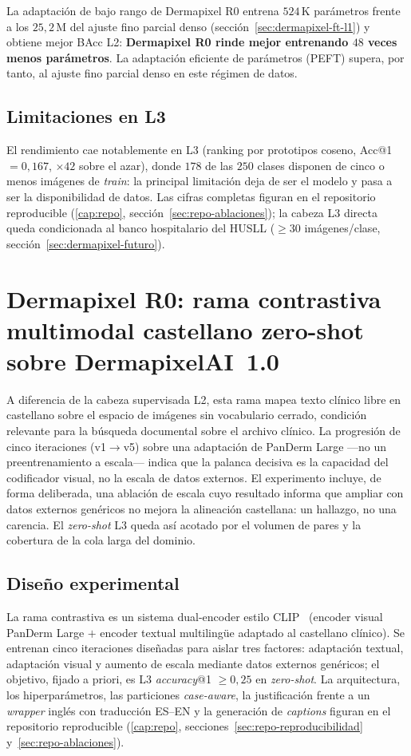 La adaptación de bajo rango de Dermapixel R0 entrena $524$\,K
parámetros frente a los $25{,}2$\,M del ajuste fino parcial denso
(sección~\ref{sec:dermapixel-ft-l1}) y obtiene mejor BAcc L2:
\textbf{Dermapixel R0 rinde mejor entrenando $48$ veces menos
parámetros}. La adaptación eficiente de parámetros (PEFT) supera, por
tanto, al ajuste fino parcial denso en este régimen de datos.

\subsection{Limitaciones en L3}

El rendimiento cae notablemente en L3 (ranking por prototipos coseno,
Acc@1 $= 0{,}167$, $\times 42$ sobre el azar), donde $178$ de las $250$
clases disponen de cinco o menos imágenes de \emph{train}: la principal
limitación deja de ser el modelo y pasa a ser la disponibilidad de
datos. Las cifras completas figuran en el repositorio reproducible
(\ref{cap:repo}, sección~\ref{sec:repo-ablaciones}); la cabeza L3 directa queda
condicionada al banco hospitalario del HUSLL ($\geq 30$ imágenes/clase,
sección~\ref{sec:dermapixel-futuro}).

\section{Dermapixel R0: rama contrastiva multimodal castellano
zero-shot sobre DermapixelAI~1.0}
\label{sec:spanderm-clip}

A diferencia de la cabeza supervisada L2, esta rama mapea texto
clínico libre en castellano sobre el espacio de imágenes sin
vocabulario cerrado, condición relevante para la búsqueda documental
sobre el archivo clínico. La progresión de cinco iteraciones
(v1$\to$v5) sobre una adaptación de PanDerm Large ---no un
preentrenamiento a escala--- indica que la palanca decisiva es la
capacidad del codificador visual, no la escala de datos externos. El
experimento incluye, de forma deliberada, una ablación de escala cuyo
resultado informa que ampliar con datos externos genéricos no mejora
la alineación castellana: un hallazgo, no una carencia. El
\emph{zero-shot} L3 queda así acotado por el volumen de pares y la
cobertura de la cola larga del dominio.

\subsection{Diseño experimental}

La rama contrastiva es un sistema dual-encoder estilo
CLIP~\cite{clip2021} (encoder visual PanDerm Large $+$ encoder textual
multilingüe adaptado al castellano clínico). Se entrenan cinco
iteraciones diseñadas para aislar tres factores: adaptación textual,
adaptación visual y aumento de escala mediante datos externos
genéricos; el objetivo, fijado a priori, es L3 \emph{accuracy}@1
$\geq 0{,}25$ en \emph{zero-shot}. La arquitectura, los hiperparámetros,
las particiones \emph{case-aware}, la justificación frente a un
\emph{wrapper} inglés con traducción ES--EN y la generación de
\emph{captions} figuran en el repositorio reproducible (\ref{cap:repo},
secciones~\ref{sec:repo-reproducibilidad} y~\ref{sec:repo-ablaciones}).

